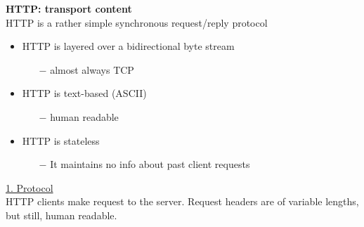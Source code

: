 \documentclass[a4paper, fontsize=8pt, landscape, DIV=1]{scrartcl}
\begin{document}
\begin{multicols*}{4}
		\textbf{HTTP: transport content}\\
		HTTP is a rather simple synchronous request/reply protocol
		\begin{itemize}[noitemsep]
			\item HTTP is layered over a bidirectional byte stream
			\begin{itemize}
				\item[$-$] almost always TCP
			\end{itemize}
			\item HTTP is text-based (ASCII)
			\begin{itemize}
				\item[$-$] human readable
			\end{itemize}
			\item HTTP is stateless
			\begin{itemize}
				\item[$-$] It maintains no info about past client requests
			\end{itemize}
		\end{itemize}
		
		\underline{1. Protocol}\\
		HTTP clients make request to the server. Request headers are of variable
		lengths, but still, human readable.\\
		

\end{multicols*}
\end{document}
